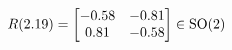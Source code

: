 \documentclass[preview]{standalone}
\begin{document}
\begin{align*}
\special{dvisvgm:raw <g id='unique000'>}R(2.19) = \begin{bmatrix} -0.58 & -0.81 \\ 0.81 & -0.58 \end{bmatrix} \in \text{SO}(2)\special{dvisvgm:raw </g>}
\end{align*}
\end{document}
